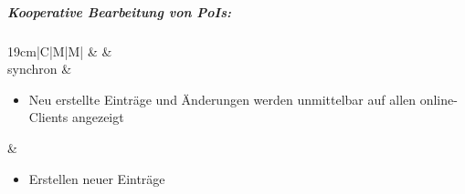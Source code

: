 \subparagraph{Kooperative Bearbeitung von PoIs:}
	\begin{table}[H]
  		\begin{adjustwidth}{-1.7cm}{1.7cm}
		\centering
		\begin{tabulary}{19cm}{|C|M|M|}
			\hline
		  &  &  \\ \hline
synchron &
				\begingroup
    				\fontsize{9pt}{10pt}\selectfont
\begin{itemize}[leftmargin=*,noitemsep,topsep=0ex,parsep=1pt,partopsep=0pt]
	\item Neu erstellte Einträge und Änderungen werden unmittelbar
		  auf allen online-Clients angezeigt
\end{itemize}
				\endgroup
&
				\begingroup
    				\fontsize{9pt}{10pt}\selectfont
\begin{itemize}[leftmargin=*,noitemsep,topsep=0ex,parsep=1pt,partopsep=0pt]
	\item Erstellen neuer Einträge

\end{itemize}
\end{tabulary}
\end{adjustwidth}
\end{table}
